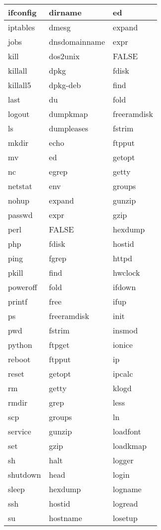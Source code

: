 \begin{longtable}{llp{50mm}}
ifconfig & dirname & ed \\ \hline
iptables & dmesg & expand \\ \hline
jobs & dnsdomainname & expr \\ \hline
kill & dos2unix & FALSE \\ \hline
killall & dpkg & fdisk \\ \hline
killall5 & dpkg-deb & find \\ \hline
last & du & fold \\ \hline
logout & dumpkmap & freeramdisk \\ \hline
ls & dumpleases & fstrim \\ \hline
mkdir & echo & ftpput \\ \hline
mv & ed & getopt \\ \hline
nc & egrep & getty \\ \hline
netstat & env & groups \\ \hline
nohup & expand & gunzip \\ \hline
passwd & expr & gzip \\ \hline
perl & FALSE & hexdump \\ \hline
php & fdisk & hostid \\ \hline
ping & fgrep & httpd \\ \hline
pkill & find & hwclock \\ \hline
poweroff & fold & ifdown \\ \hline
printf & free & ifup \\ \hline
ps & freeramdisk & init \\ \hline
pwd & fstrim & insmod \\ \hline
python & ftpget & ionice \\ \hline
reboot & ftpput & ip \\ \hline
reset & getopt & ipcalc \\ \hline
rm & getty & klogd \\ \hline
rmdir & grep & less \\ \hline
scp & groups & ln \\ \hline
service & gunzip & loadfont \\ \hline
set & gzip & loadkmap \\ \hline
sh & halt & logger \\ \hline
shutdown & head & login \\ \hline
sleep & hexdump & logname \\ \hline
ssh & hostid & logread \\ \hline
su & hostname & losetup \\ \hline

\end{longtable}
